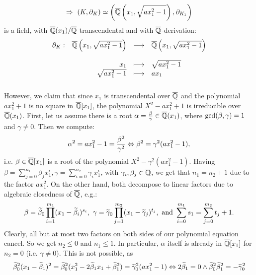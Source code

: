 $$\Rightarrow\ (K, \partial_K) \simeq \left(\overline{\mathbb{Q}}\left(x_1,\sqrt{a x_1^2 - 1}\right), \partial_{K_1}\right)$$%
is a field, with $\overline{\mathbb{Q}}(x_1)/\overline{\mathbb{Q}}$ transcendental and with $\overline{\mathbb{Q}}$-derivation:%
$$\bao{rrcl}
\partial_{K}%
 : &\currfield\left(x_1,\sqrt{a x_1^2 - 1}\right)&\longrightarrow&\currfield\left(x_1,\sqrt{a x_1^2 - 1}\right)\\
&&&\\
&x_1 &\longmapsto& \sqrt{a x_1^2 - 1}\\
&\sqrt{a x_1^2 - 1} &\longmapsto& a x_1\\
&&&\\
\ea$$
However, we claim that since $x_1$ is transcendental over $\overline{\mathbb{Q}}$ and the polynomial $a x_1^2 +1$ is no square in $\overline{\mathbb{Q}}[x_1]$, the polynomial $X^2 - a x_1^2 + 1$ is irreducible over $\overline{\mathbb{Q}}(x_1)$. First, let us assume there is a root $\alpha = \frac{\beta}{\gamma} \in \overline{\mathbb{Q}}(x_1)$, where $\mathrm{gcd}(\beta,\gamma) = 1$ and $\gamma \neq 0$. Then we compute:
$$\alpha^2 = a x_1^2 - 1 = \frac{\beta^2}{\gamma^2} \Leftrightarrow \beta^2 = \gamma^2 (a x_1^2 - 1),$$
i.e. $\beta \in \overline{\mathbb{Q}}[x_1]$ is a root of the polynomial $X^2 - \gamma^2(a x_1^2 - 1)$. Having $\beta = \sum_{j=0}^{n_1} \beta_j x_1^i, \gamma = \sum_{i=0}^{n_2} \gamma_i x_1^i$, with $\gamma_i, \beta_j \in \overline{\mathbb{Q}}$, we get that $n_1 = n_2 + 1$ due to the factor $a x_1^2$. On the other hand, both decompose to linear factors due to algebraic closedness of $\overline{\mathbb{Q}}$, e.g.:
$$\beta = \widetilde{\beta}_0 \prod_{i=1}^{m_1} (x_1 - \widetilde{\beta}_i)^{s_i},\ \gamma = \widetilde{\gamma}_0 \prod_{j=1}^{m_2} (x_1 - \widetilde{\gamma}_j)^{t_j},\ \mathrm{and}\ \sum_{i=0}^{m_1} s_1 = \sum_{j=0}^{m_2} t_j + 1.$$
Clearly, all but at most two factors on both sides of our polynomial equation cancel. So we get $n_2 \leq 0$ and $n_1 \leq 1$. In particular, $\alpha$ itself is already in $\overline{\mathbb{Q}}[x_1]$ for $n_2 = 0$ (i.e. $\gamma \neq 0$). This is not possible, as
$$\widetilde{\beta}_0^2 (x_1 - \widetilde{\beta}_1)^2 = \widetilde{\beta}_0^2(x_1^2 - 2 \widetilde{\beta}_1 x_1 + \widetilde{\beta}_1^2) = \widetilde{\gamma}_0^2 (a x_1^2 - 1) \Leftrightarrow 2 \widetilde{\beta}_1 = 0 \wedge \widetilde{\beta}_0^2 \widetilde{\beta}_1^2 = -\widetilde{\gamma}_0^2$$
